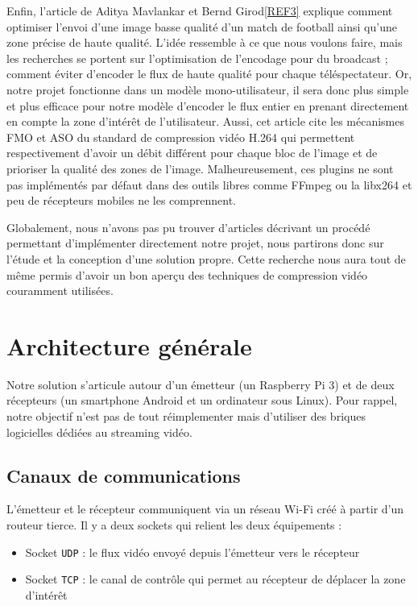 \documentclass[11pt,a4paper]{article}
\begin{document}
\bigbreak
	Enfin, l'article de Aditya Mavlankar et Bernd Girod\ref{REF3} explique comment optimiser l’envoi d’une image basse qualité d’un match de football ainsi qu’une zone précise de haute qualité.
L’idée ressemble à ce que nous voulons faire, mais les recherches se portent sur l’optimisation de l’encodage pour du broadcast ; comment éviter d’encoder le flux de haute qualité pour chaque téléspectateur.
Or, notre projet fonctionne dans un modèle mono-utilisateur, il sera donc plus simple et plus efficace pour notre modèle d’encoder le flux entier en prenant directement en compte la zone d'intérêt de l'utilisateur.
Aussi, cet article cite les mécanismes FMO et ASO du standard de compression vidéo H.264 qui permettent respectivement d’avoir un débit différent pour chaque bloc de l'image et de prioriser la qualité des zones de l’image.
Malheureusement, ces plugins ne sont pas implémentés par défaut dans des outils libres comme FFmpeg ou la libx264 et peu de récepteurs mobiles ne les comprennent.

\bigbreak
Globalement, nous n'avons pas pu trouver d'articles décrivant un procédé permettant d'implémenter directement notre projet, nous partirons donc sur l'étude et la conception d'une solution propre.
Cette recherche nous aura tout de même permis d'avoir un bon aperçu des techniques de compression vidéo couramment utilisées.


\section{Architecture générale}
Notre solution s'articule autour d'un émetteur (un Raspberry Pi 3) et de deux récepteurs (un smartphone Android et un ordinateur sous Linux).
Pour rappel, notre objectif n'est pas de tout réimplementer mais d'utiliser des briques logicielles dédiées au streaming vidéo.

\subsection{Canaux de communications}
L'émetteur et le récepteur communiquent via un réseau Wi-Fi créé à partir d'un routeur tierce.
Il y a deux sockets qui relient les deux équipements :

\bigbreak
\begin{itemize}
\item{Socket \texttt{UDP} : le flux vidéo envoyé depuis l'émetteur vers le récepteur}
\item{Socket \texttt{TCP} : le canal de contrôle qui permet au récepteur de déplacer la zone d'intérêt}
\end{itemize}
\end{document}
